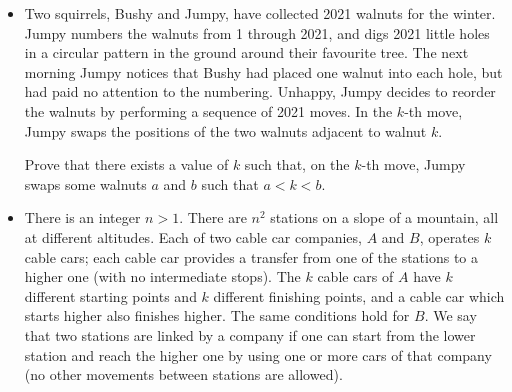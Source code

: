 \documentclass[11pt]{scrartcl}
\begin{document}
\begin{itemize}[leftmargin=*]
\begin{enumerate}[(a)]
\end{enumerate}
We say that a tree is majestic if its height is at least $10^6$. Determine the largest $K$ such that the gardener can ensure there are eventually $K$ majestic trees on the board, no matter how the lumberjack plays. 
\item {} Two squirrels, Bushy and Jumpy, have collected 2021 walnuts for the winter. Jumpy numbers the walnuts from 1 through 2021, and digs 2021 little holes in a circular pattern in the ground around their favourite tree. The next morning Jumpy notices that Bushy had placed one walnut into each hole, but had paid no attention to the numbering. Unhappy, Jumpy decides to reorder the walnuts by performing a sequence of 2021 moves. In the $k$-th move, Jumpy swaps the positions of the two walnuts adjacent to walnut $k$.

Prove that there exists a value of $k$ such that, on the $k$-th move, Jumpy swaps some walnuts $a$ and $b$ such that $a<k<b$. 
\item {} There is an integer $n > 1$. There are $n^2$ stations on a slope of a mountain, all at different altitudes. Each of two cable car companies, $A$ and $B$, operates $k$ cable cars; each cable car provides a transfer from one of the stations to a higher one (with no intermediate stops). The $k$ cable cars of $A$ have $k$ different starting points and $k$ different finishing points, and a cable car which starts higher also finishes higher. The same conditions hold for $B$. We say that two stations are linked by a company if one can start from the lower station and reach the higher one by using one or more cars of that company (no other movements between stations are allowed). 


\end{itemize}
\end{document}
